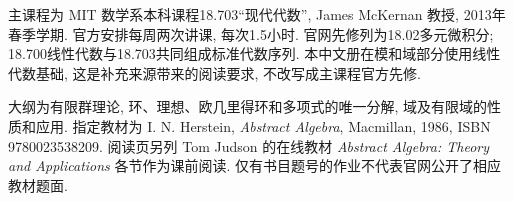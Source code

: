 \par
主课程为 MIT 数学系本科课程18.703“现代代数”, James McKernan 教授, 2013年春季学期. 官方安排每周两次讲课, 每次1.5小时. 官网先修列为18.02多元微积分; 18.700线性代数与18.703共同组成标准代数序列. 本中文册在模和域部分使用线性代数基础, 这是补充来源带来的阅读要求, 不改写成主课程官方先修.

大纲为有限群理论, 环、理想、欧几里得环和多项式的唯一分解, 域及有限域的性质和应用. 指定教材为 I. N. Herstein, \textit{Abstract Algebra}, Macmillan, 1986, ISBN 9780023538209. 阅读页另列 Tom Judson 的在线教材 \textit{Abstract Algebra: Theory and Applications} 各节作为课前阅读. 仅有书目题号的作业不代表官网公开了相应教材题面.

